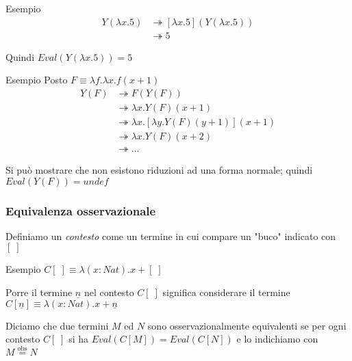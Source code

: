 \documentclass{beamer}
\newcommand{\eqobs}{\stackrel{\text{obs}}{=}}
\begin{document}
\begin{frame}

	\begin{block}{Esempio}
		\begin{align*}
			Y(\lambda x .5) & \twoheadrightarrow [\lambda x .5](Y(\lambda x .5)) \\
											& \twoheadrightarrow 5 
		\end{align*}
	
		Quindi $Eval( Y(\lambda x . 5) ) = 5$
	
	\end{block}

	\begin{block}{Esempio}
			Posto $F \equiv \lambda f . \lambda x . f(x+1)$
			\begin{align*}
				Y(F) & \twoheadrightarrow F(Y(F)) \\
						 & \twoheadrightarrow \lambda x . Y(F)(x+1) \\
						 & \twoheadrightarrow \lambda x . [\lambda y . Y(F)(y+1)](x+1) \\
						 & \twoheadrightarrow \lambda x . Y(F)(x+2) \\
						 & \twoheadrightarrow \dots
			\end{align*}
			
			Si può mostrare che non esistono riduzioni ad una forma normale; quindi $Eval(Y(F))=undef$

	\end{block}

\end{frame}

\begin{frame}
	
	\frametitle{Equivalenza osservazionale}
	
	Definiamo un \emph{contesto} come un termine in cui compare un "buco" indicato con $[\;]$
	
	\begin{block}{Esempio}
		$C[\;] \equiv \lambda (x:Nat).x+[\;]$
		
		Porre il termine $\underline{n}$ nel contesto $C[\;]$ significa considerare il termine
		$C[\underline{n}] \equiv \lambda (x:Nat).x+\underline{n}$
	\end{block}
	
	Diciamo che due termini $M$ ed $N$ sono osservazionalmente equivalenti se per ogni contesto $C[\;]$ si ha $Eval(C[M])=Eval(C[N])$
	e lo indichiamo con $M\eqobs N$
	
\end{frame}
\end{document}
